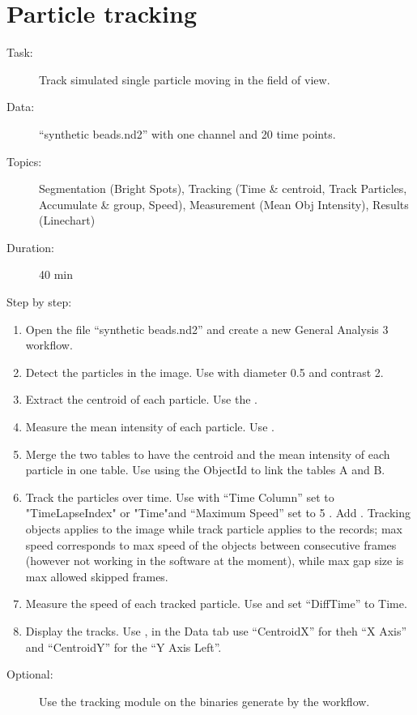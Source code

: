 \section{Particle tracking}

\begin{description}
    \item[Task:] Track simulated single particle moving in the field of view.
    \item[Data:] ``synthetic beads.nd2'' with one channel and 20 time points.
    \item[Topics:] Segmentation (Bright Spots), Tracking (Time \& centroid, Track Particles, Accumulate \& group, Speed), Measurement (Mean Obj Intensity), Results (Linechart)
    \item[Duration:] 40 min
    \item[Step by step:]
\end{description}

\begin{enumerate}
    \item Open the file ``synthetic beads.nd2'' and create a new General Analysis 3 workflow.
    \item Detect the particles in the image. \soln Use  with diameter 0.5 and contrast 2. \solnend
    \item Extract the centroid of each particle. \soln Use the . \solnend
    \item Measure the mean intensity of each particle. \soln Use . \solnend
    \item Merge the two tables to have the centroid and the mean intensity of each particle in one table.  \soln Use  using the ObjectId to link the tables A and B. \solnend
    \item Track the particles over time. Use  with ``Time Column'' set to "TimeLapseIndex" or "Time"\soln and ``Maximum Speed'' set to 5 \solnend. Add . Tracking objects applies to the image while track particle applies to the records; max speed corresponds to max speed of the objects between consecutive frames (however not working in the software at the moment), while max gap size is max allowed skipped frames.
    \item Measure the speed of each tracked particle. \soln Use  and set ``DiffTime'' to Time. \solnend
    \item Display the tracks. Use , in the Data tab use ``CentroidX'' for theh ``X Axis'' and ``CentroidY'' for the ``Y Axis Left''.
\end{enumerate}

\begin{description}
    \item[Optional:] Use the tracking module on the binaries generate by the workflow.
\end{description}
